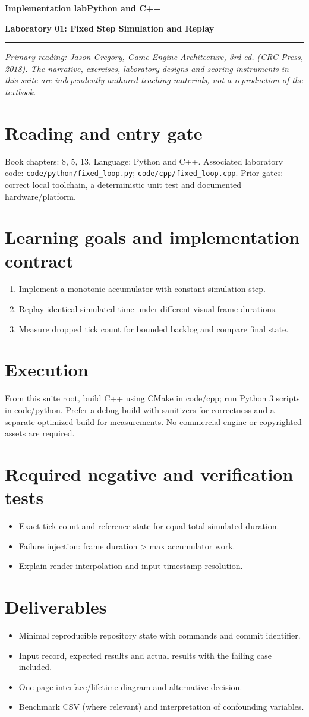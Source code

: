 \documentclass[11pt,letterpaper]{article}
\newcommand{\DocType}{Reference}
\newcommand{\SuiteHeading}[3]{%
\renewcommand{\DocType}{#2}%
{\small\bfseries\sffamily\color{EngineTeal}#2\hfill #3}\par\vspace{6pt}
{\LARGE\bfseries\color{EngineBlue}#1}\par\vspace{4pt}
{\color{EngineTeal}\rule{\linewidth}{1pt}}\par\vspace{7pt}}
\newcommand{\SourceNote}{\footnotesize\textit{Primary reading: Jason Gregory, \emph{Game Engine Architecture}, 3rd ed. (CRC Press, 2018). The narrative, exercises, laboratory designs and scoring instruments in this suite are independently authored teaching materials, not a reproduction of the textbook.}\normalsize\par}
\begin{document}
\SuiteHeading{Laboratory 01: Fixed Step Simulation and Replay}{Implementation lab}{Python and C++}
\SourceNote
\section{Reading and entry gate}
Book chapters: 8, 5, 13. Language: Python and C++. Associated laboratory code: \nolinkurl{code/python/fixed_loop.py}; \nolinkurl{code/cpp/fixed_loop.cpp}. Prior gates: correct local toolchain, a deterministic unit test and documented hardware/platform.

\section{Learning goals and implementation contract}
\begin{enumerate}
\item Implement a monotonic accumulator with constant simulation step.
\item Replay identical simulated time under different visual-frame durations.
\item Measure dropped tick count for bounded backlog and compare final state.
\end{enumerate}
\section{Execution}
From this suite root, build C++ using CMake in code/cpp; run Python 3 scripts in code/python. Prefer a debug build with sanitizers for correctness and a separate optimized build for measurements. No commercial engine or copyrighted assets are required.

\section{Required negative and verification tests}
\begin{itemize}
\item Exact tick count and reference state for equal total simulated duration.
\item Failure injection: frame duration > max accumulator work.
\item Explain render interpolation and input timestamp resolution.
\end{itemize}
\section{Deliverables}
\begin{itemize}
\item Minimal reproducible repository state with commands and commit identifier.
\item Input record, expected results and actual results with the failing case included.
\item One-page interface/lifetime diagram and alternative decision.
\item Benchmark CSV (where relevant) and interpretation of confounding variables.
\end{itemize}
\end{document}
